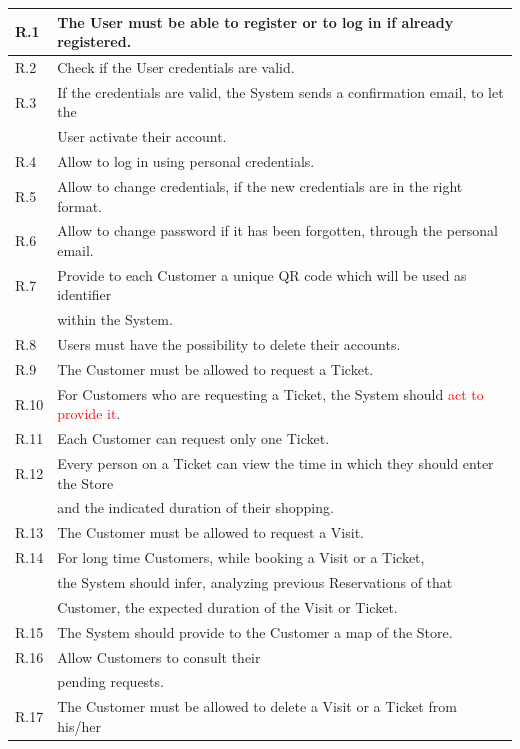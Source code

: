 \documentclass[a4paper, 12pt, oneside, table]{article}
\newcommand{\yasmin}[1]{\textcolor{Red}{#1}}
\begin{document}
\begin{tabularx}{\linewidth}{| o || l |}
    \hline
    R.1 & The User must be able to register or to log in if already registered.\\
    \hline
	R.2 & Check if the User credentials are valid.\\
	\hline
	R.3 & If the credentials are valid, the System sends a confirmation email, to let the\\
	& User activate their account.\\
	\hline
	R.4 & Allow to log in using personal credentials. \\
	\hline
	R.5 & Allow to change credentials, if the new credentials are in the right format. \\
	\hline
	R.6 & Allow to change password if it has been forgotten, through the personal email. \\
	\hline
	R.7 & Provide to each Customer a unique QR code which will be used as identifier\\
	& within the System.\\
	\hline
	R.8 & Users must have the possibility to delete their accounts. \\
	\hline
	R.9 & The Customer must be allowed to request a Ticket. \\
	\hline
	R.10 & For Customers who are requesting a Ticket, the System should \yasmin{act to provide it}. \\
	\hline
	R.11 & Each Customer can request only one Ticket. \\
	\hline
	R.12 & Every person on a Ticket can view the time in which they should enter the Store\\
	& and the indicated duration of their shopping. \\
	\hline
	R.13 & The Customer must be allowed to request a Visit.\\
	\hline
	R.14 & For long time Customers, while booking a Visit or a Ticket,\\
	& the System should infer, analyzing previous Reservations of that\\ 
	& Customer, the expected duration of the Visit or Ticket. \\
	\hline
	R.15 & The System should provide to the Customer a map of the Store.\\
	\hline
	R.16 & Allow Customers to consult their\\
	& pending requests.\\
	\hline
	R.17 & The Customer must be allowed to delete a Visit or a Ticket from his/her\\

\end{tabularx}
\end{document}
